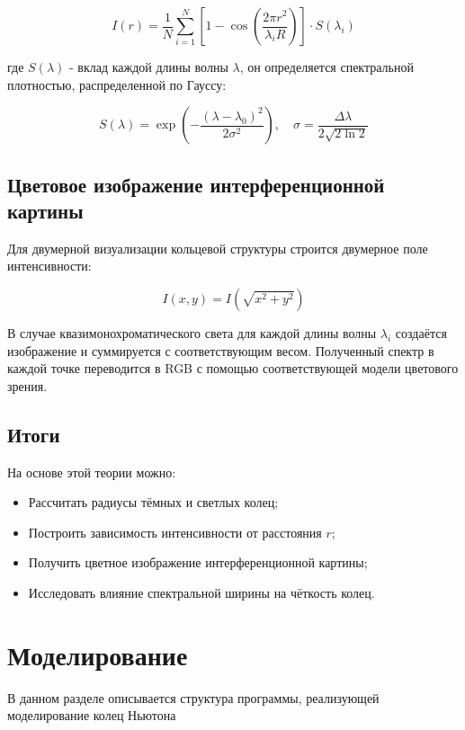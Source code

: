 \documentclass[a4paper,11pt]{article}
\theoremstyle{definition}
\begin{document}
    \begin{equation}
        I(r) = \frac{1}{N} \sum_{i=1}^{N} \left[1 - \cos\left( \frac{2\pi r^2}{\lambda_i R} \right) \right] \cdot S(\lambda_i)\label{eq:equation7}
    \end{equation}

    где \( S(\lambda) \) - вклад каждой длины волны \(\lambda\), он определяется спектральной плотностью,
    распределенной по Гауссу:

    \begin{equation}
        S(\lambda) = \exp\left( -\frac{(\lambda - \lambda_0)^2}{2\sigma^2} \right), \quad \sigma = \frac{\Delta\lambda}{2\sqrt{2 \ln 2}}\label{eq:equation8}
    \end{equation}

    \subsection{Цветовое изображение интерференционной картины}
    Для двумерной визуализации кольцевой структуры строится двумерное поле интенсивности:

    \begin{equation}
        I(x, y) = I\left( \sqrt{x^2 + y^2} \right)\label{eq:equation9}
    \end{equation}

    В случае квазимонохроматического света для каждой длины волны \( \lambda_i \) создаётся изображение
    и суммируется с соответствующим весом. Полученный спектр в каждой точке переводится в RGB с помощью
    соответствующей модели цветового зрения.

    \subsection{Итоги}
    На основе этой теории можно:
    \begin{itemize}
        \item Рассчитать радиусы тёмных и светлых колец;
        \item Построить зависимость интенсивности от расстояния \( r \);
        \item Получить цветное изображение интерференционной картины;
        \item Исследовать влияние спектральной ширины на чёткость колец.
    \end{itemize}



\section{Моделирование}
    В данном разделе описывается структура программы, реализующей моделирование колец Ньютона
\end{document}
